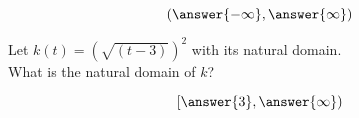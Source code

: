 \documentclass{ximera}
\begin{document}
\begin{exercise}
\begin{question}
\[
\left( \answer{-\infty}, \answer{\infty}  \right)
\]


\end{question}













\begin{question}


Let $k(t) = \left( \sqrt{(t - 3)} \right)^2$ with its natural domain. \\

What is the natural domain of $k$?

\[
\left[ \answer{3}, \answer{\infty}  \right)
\]


\end{question}




















\end{exercise}
\end{document}
